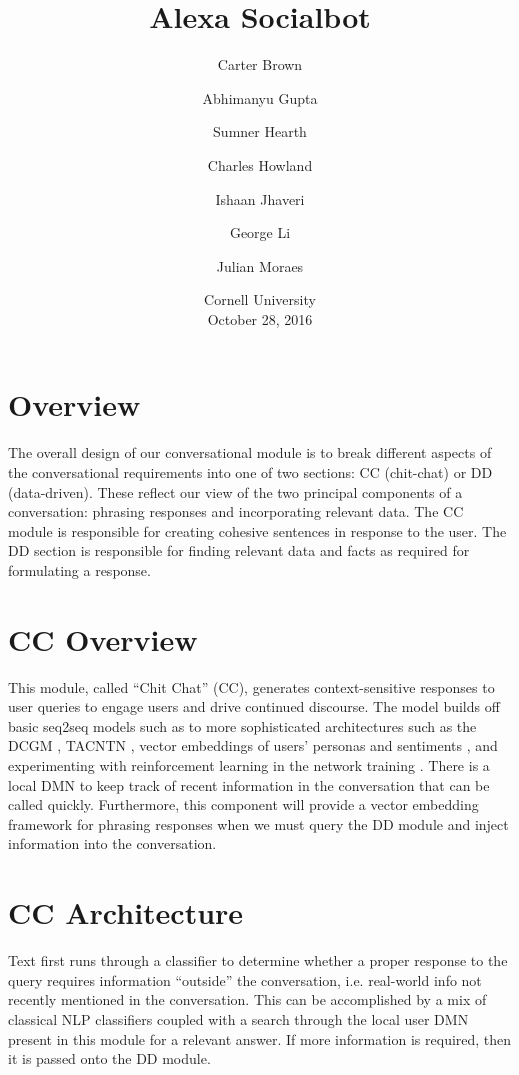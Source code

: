 \documentclass[10pt,twoside,twocolumn]{article}
\title{Alexa Socialbot}
\author{Carter Brown \and Abhimanyu Gupta \and Sumner Hearth \and Charles Howland \and Ishaan Jhaveri \and George Li \and Julian Moraes}
\date{%
    Cornell University\\%
    October 28, 2016\\%
}%
\begin{document}
\maketitle

\section{Overview}
The overall design of our conversational module is to break different aspects of the conversational requirements into one of two sections: CC (chit-chat) or DD (data-driven). These reflect our view of the two principal components of a conversation: phrasing responses and incorporating relevant data. The CC module is responsible for creating cohesive sentences in response to the user. The DD section is responsible for finding relevant data and facts as required for formulating a response.

\section{CC Overview}
This module, called ``Chit Chat'' (CC), generates context-sensitive responses to user queries to engage users and drive continued discourse. The model builds off basic seq2seq models such as \cite{Vinyals2015} to more sophisticated architectures such as the DCGM \cite{Sordoni2015}, TACNTN \cite{Wu}, vector embeddings of users' personas and sentiments \cite{Li2016a}, and experimenting with reinforcement learning in the network training \cite{Zaremba2015, Williams2016, Li2016b}. There is a local DMN \cite{Kumar:2015, Xiong2016} to keep track of recent information in the conversation that can be called quickly. Furthermore, this component will provide a vector embedding framework for phrasing responses when we must query the DD module and inject information into the conversation.

\section{CC Architecture}

Text first runs through a classifier to determine whether a proper response to the query requires information ``outside'' the conversation, i.e. real-world info not recently mentioned in the conversation. This can be accomplished by a mix of classical NLP classifiers coupled with a search through the local user DMN present in this module for a relevant answer. If more information is required, then it is passed onto the DD module.
\end{document}

